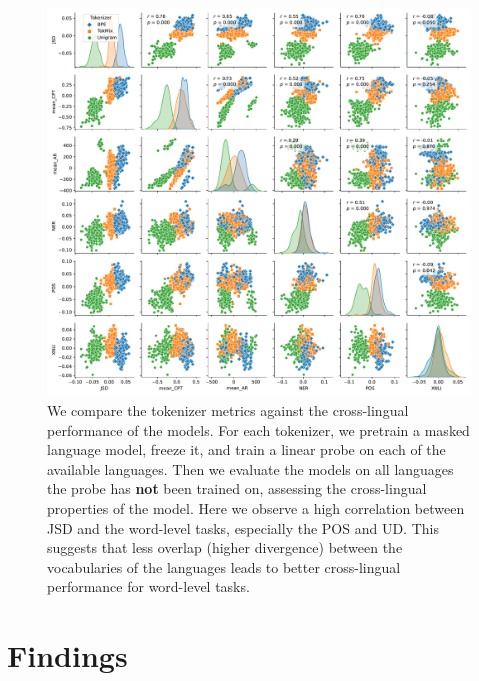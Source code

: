 \begin{figure}
    \centering
    \includegraphics[width=\textwidth]{figures/X_pair_analysis_20L.pdf}
    \caption{We compare the tokenizer metrics against the cross-lingual performance of the models. For each tokenizer, we pretrain a masked language model, freeze it, and train a linear probe on each of the available languages. Then we evaluate the models on all languages the probe has \textbf{not} been trained on, assessing the cross-lingual properties of the model. Here we observe a high correlation between JSD and the word-level tasks, especially the POS and UD. This suggests that less overlap (higher divergence) between the vocabularies of the languages leads to better cross-lingual performance for word-level tasks.} 
    \label{fig:X_pair_analysis_20L}
\end{figure}





\section{Findings}


